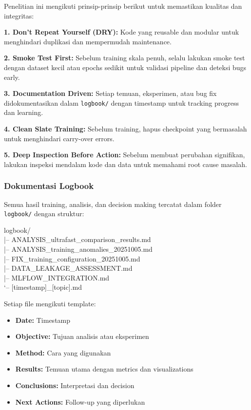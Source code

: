 \documentclass[12pt,a4paper]{article}
\begin{document}
Penelitian ini mengikuti prinsip-prinsip berikut untuk memastikan kualitas dan integritas:

\textbf{1. Don't Repeat Yourself (DRY):} Kode yang reusable dan modular untuk menghindari duplikasi dan mempermudah maintenance.

\textbf{2. Smoke Test First:} Sebelum training skala penuh, selalu lakukan smoke test dengan dataset kecil atau epochs sedikit untuk validasi pipeline dan deteksi bugs early.

\textbf{3. Documentation Driven:} Setiap temuan, eksperimen, atau bug fix didokumentasikan dalam \texttt{logbook/} dengan timestamp untuk tracking progress dan learning.

\textbf{4. Clean Slate Training:} Sebelum training, hapus checkpoint yang bermasalah untuk menghindari carry-over errors.

\textbf{5. Deep Inspection Before Action:} Sebelum membuat perubahan signifikan, lakukan inspeksi mendalam kode dan data untuk memahami root cause masalah.

\subsubsection{Dokumentasi Logbook}
\label{subsubsec:logbook-documentation}

Semua hasil training, analisis, dan decision making tercatat dalam folder \texttt{logbook/} dengan struktur:

\begin{center}
\ttfamily
logbook/\\\relax
|-- ANALYSIS\_ultrafast\_comparison\_results.md\\\relax
|-- ANALYSIS\_training\_anomalies\_20251005.md\\\relax
|-- FIX\_training\_configuration\_20251005.md\\\relax
|-- DATA\_LEAKAGE\_ASSESSMENT.md\\\relax
|-- MLFLOW\_INTEGRATION.md\\\relax
`-- [timestamp]\_[topic].md
\end{center}

Setiap file mengikuti template:
\begin{itemize}[leftmargin=*, nosep]
\item \textbf{Date:} Timestamp
\item \textbf{Objective:} Tujuan analisis atau eksperimen
\item \textbf{Method:} Cara yang digunakan
\item \textbf{Results:} Temuan utama dengan metrics dan visualizations
\item \textbf{Conclusions:} Interpretasi dan decision
\item \textbf{Next Actions:} Follow-up yang diperlukan
\end{itemize}
\end{document}
